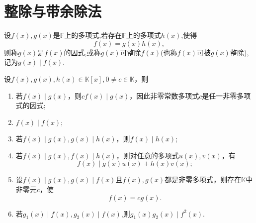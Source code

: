 \documentclass[../../main.tex]{subfiles}
\begin{document}
\section{整除与带余除法}

\begin{definition}[整除的定义]\label{definition:整除的定义}
设\(f(x),g(x)\)是\(\mathbb{F}\)上的多项式,若存在\(\mathbb{F}\)上的多项式\(h(x)\),使得
\[
f(x)=g(x)h(x),
\]
则称\(g(x)\)是\(f(x)\)的因式,或称\(g(x)\)可整除\(f(x)\)(也称\(f(x)\)可被\(g(x)\)整除),记为\(g(x)\mid f(x)\).
\end{definition}

\begin{proposition}[整除的基本性质]\label{proposition:整除的基本性质}
设\(f(x),g(x),h(x)\in\mathbb{K}[x],0\neq c\in\mathbb{K}\)，则
\begin{enumerate}[(1)]
\item 若\(f(x)\mid g(x)\)，则\(cf(x)\mid g(x)\)，因此非零常数多项式\(c\)是任一非零多项式的因式;

\item  \(f(x)\mid f(x)\);

\item 若\(f(x)\mid g(x),g(x)\mid h(x)\)，则\(f(x)\mid h(x)\);

\item 若\(f(x)\mid g(x),f(x)\mid h(x)\)，则对任意的多项式\(u(x),v(x)\)，有
\[
f(x)\mid g(x)u(x)+h(x)v(x);
\]

\item 设\(f(x)\mid g(x),g(x)\mid f(x)\)且\(f(x),g(x)\)都是非零多项式，则存在\(\mathbb{K}\)中非零元\(c\)，使
\[
f(x)=cg(x).
\]

\item 若$g_1(x)\mid f(x),g_2(x)\mid f(x)$,则$g_1(x)g_2(x)\mid f^2(x)$.
\end{enumerate}
\end{proposition}
\end{document}
